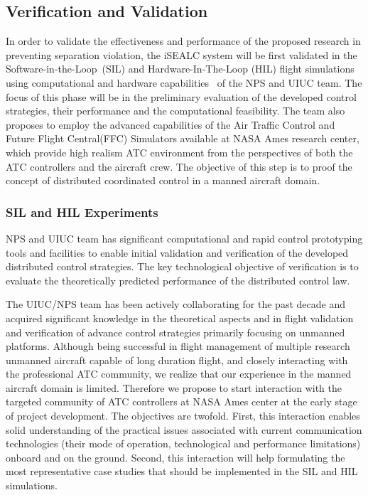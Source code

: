 \documentclass[letter,onecolumn,12pt]{aiaa-tc}
\newcommand{\1}{1_n}
\begin{document}
\subsection{Verification and Validation}

In order to validate the effectiveness and performance of the proposed research in preventing separation violation, the iSEALC system will be first validated in the Software-in-the-Loop~(SIL) and Hardware-In-The-Loop (HIL) flight simulations using computational and hardware capabilities~\cite{dobrokhodov2013RFCPS} of the NPS and UIUC team. The focus of this phase will be in the preliminary evaluation of the developed control strategies, their performance and the computational feasibility. The team also proposes to employ the advanced capabilities of the Air Traffic Control  and Future Flight Central(FFC) Simulators available at NASA Ames research center\cite{prevot2003distributed}, which provide high realism ATC environment from the perspectives of both the ATC controllers and the aircraft crew. The objective of this step is to proof the concept of distributed coordinated  control in a manned aircraft domain.

\subsubsection{SIL and HIL Experiments}
NPS and UIUC team has significant computational and rapid control prototyping tools and facilities to enable initial validation and verification of the developed distributed control strategies. The key technological objective of verification is to evaluate the theoretically predicted performance of the distributed control law.

The UIUC/NPS team has been actively collaborating for the past decade and acquired significant knowledge in the theoretical aspects and in flight validation and verification of advance control strategies primarily focusing on unmanned platforms. Although being successful in flight management of multiple research unmanned aircraft capable of long duration flight, and closely interacting with the professional ATC community, we realize that our experience in the manned aircraft domain is limited. Therefore we propose to start interaction with the targeted community of ATC controllers at NASA Ames center at the early stage of project development. The objectives are twofold. First, this interaction enables solid understanding of the practical issues associated with current communication technologies (their mode of operation, technological and performance limitations) onboard and on the ground. Second, this interaction will help formulating the most representative case studies that should be implemented in the SIL and HIL simulations.
\end{document}
